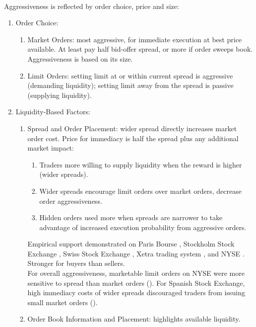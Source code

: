 \begin{remark} \\
Aggressiveness is reflected by order choice, price and size:
\begin{enumerate}[label=\roman*.]
\setlength{\itemsep}{0pt}
\item Order Choice:
\begin{enumerate}[label=\arabic*.]
\setlength{\itemsep}{0pt}
\item Market Orders: most aggressive, for immediate execution at best price available. At least pay half bid-offer spread, or more if order sweeps book. Aggressiveness is based on its size.
\item Limit Orders: setting limit at or within current spread is aggressive (demanding liquidity); setting limit away from the spread is passive (supplying liquidity).
\end{enumerate}
\item Liquidity-Based Factors:
\begin{enumerate}[label=\arabic*.]
\setlength{\itemsep}{0pt}
\item Spread and Order Placement: wider spread directly increases market order cost. Price for immediacy is half the spread plus any additional market impact:
\begin{enumerate}[label=\alph*.]
\setlength{\itemsep}{0pt}
\item Traders more willing to supply liquidity when the reward is higher (wider spreads).
\item Wider spreads encourage limit orders over market orders, decrease order aggressiveness.
\item Hidden orders used more when spreads are narrower to take advantage of increased execution probability from aggressive orders.
\end{enumerate}
Empirical support demonstrated on Paris Bourse \cite{biais_hillion_spatt_1995}, Stockholm Stock Exchange \cite{hollifield_miller_sandas_2004}, Swiss Stock Exchange \cite{ranaldo_2004}, Xetra trading system \cite{grammig_heinen_rengifo_2004}, and NYSE \cite{beber_caglio_2005}. Stronger for buyers than sellers.\\
For overall aggressiveness, marketable limit orders on NYSE were more sensitive to spread than market orders (\cite{ellul_et_al_2003}). For Spanish Stock Exchange, high immediacy costs of wider spreads discouraged traders from issuing small market orders (\cite{pascual_veredas_2008}).
\item Order Book Information and Placement: highlights available liquidity. 

\end{enumerate}
\end{enumerate}
\end{remark}
